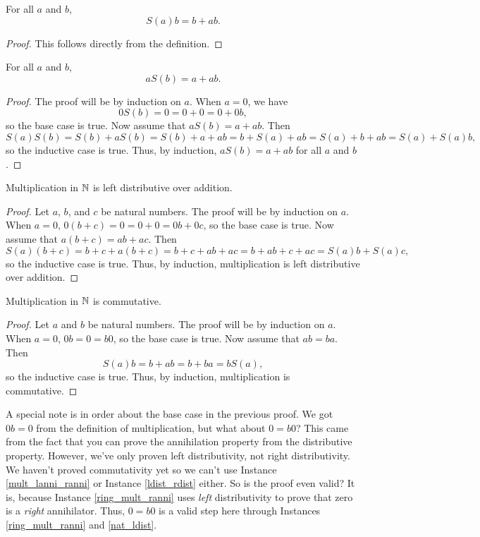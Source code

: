 \documentclass[../../math.tex]{subfiles}
\begin{document}
\begin{theorem}
    For all $a$ and $b$,
    \[
        S(a)b = b + ab.
    \]
\end{theorem}
\begin{proof}
    This follows directly from the definition.
\end{proof}

\begin{theorem}
    For all $a$ and $b$,
    \[
        aS(b) = a + ab.
    \]
\end{theorem}
\begin{proof}
    The proof will be by induction on $a$.  When $a = 0$, we have
    \[
        0S(b) = 0 = 0 + 0 = 0 + 0b,
    \]
    so the base case is true.  Now assume that $aS(b) = a + ab$.  Then
    \[
        S(a)S(b) = S(b) + aS(b) = S(b) + a + ab = b + S(a) + ab = S(a) + b + ab
        = S(a) + S(a)b,
    \]
    so the inductive case is true.  Thus, by induction, $aS(b) = a + ab$ for all
    $a$ and $b$.
\end{proof}

\begin{instance} \label{nat_ldist}
    Multiplication in $\mathbb{N}$ is left distributive over addition.
\end{instance}
\begin{proof}
    Let $a$, $b$, and $c$ be natural numbers.  The proof will be by induction on
    $a$.  When $a = 0$, $0(b + c) = 0 = 0 + 0 = 0b + 0c$, so the base case is
    true.  Now assume that $a(b + c) = ab + ac$.  Then
    \[
        S(a)(b + c) = b + c + a(b + c) = b + c + ab + ac = b + ab + c + ac =
        S(a)b + S(a)c,
    \]
    so the inductive case is true.  Thus, by induction, multiplication is left
    distributive over addition.
\end{proof}

\begin{instance}
    Multiplication in $\mathbb{N}$ is commutative.
\end{instance}
\begin{proof}
    Let $a$ and $b$ be natural numbers.  The proof will be by induction on $a$.
    When $a = 0$, $0b = 0 = b0$, so the base case is true.  Now assume that $ab
    = ba$.  Then
    \[
        S(a)b = b + ab = b + ba = bS(a),
    \]
    so the inductive case is true.  Thus, by induction, multiplication is
    commutative.
\end{proof}
A special note is in order about the base case in the previous proof.  We got
$0b = 0$ from the definition of multiplication, but what about $0 = b0$?  This
came from the fact that you can prove the annihilation property from the
distributive property.  However, we've only proven left distributivity, not
right distributivity.  We haven't proved commutativity yet so we can't use
Instance \ref{mult_lanni_ranni} or Instance \ref{ldist_rdist} either.  So is the
proof even valid?  It is, because Instance \ref{ring_mult_ranni} uses
\textit{left} distributivity to prove that zero is a \textit{right} annihilator.
Thus, $0 = b0$ is a valid step here through Instances \ref{ring_mult_ranni} and
\ref{nat_ldist}.
\end{document}
